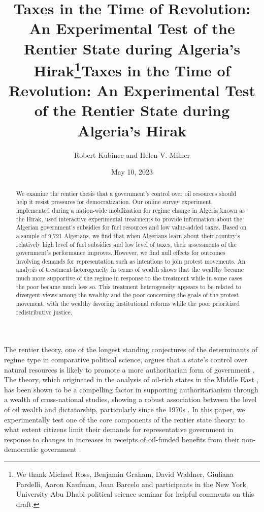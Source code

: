 \documentclass[12pt, letterpaper]{article}
\title{Taxes in the Time of Revolution: An Experimental Test of the Rentier State during Algeria's Hirak\thanks{We thank Michael Ross, Benjamin Graham, David Waldner, Giuliana Pardelli, Aaron Kaufman, Joan Barcelo and participants in the New York University Abu Dhabi political science seminar for helpful comments on this draft.}}
\author{Robert Kubinec and Helen V. Milner}
\title{Taxes in the Time of Revolution: An Experimental Test of the Rentier State during Algeria's Hirak}
\date{May 10, 2023}
\begin{document}
\maketitle

\begin{abstract}

We examine the rentier thesis that a government's control over oil resources should help it resist pressures for democratization. Our online survey experiment,  implemented during a nation-wide mobilization for regime change in Algeria known as the Hirak, used interactive experimental treatments to provide information about the Algerian government's subsidies for fuel resources and low value-added taxes. Based on a sample of 9,721 Algerians, we find that when Algerians learn about their country's relatively high level of fuel subsidies and low level of taxes, their assessments of the government's performance improves. However, we find null effects for outcomes involving demands for representation such as intentions to join protest movements. An analysis of treatment heterogeneity in terms of wealth shows that the wealthy became much more supportive of the regime in response to the treatment while in some cases the poor became much less so. This treatment heterogeneity appears to be related to divergent views among the wealthy and the poor concerning the goals of the protest movement, with the wealthy favoring institutional reforms while the poor prioritized redistributive justice.
    
\end{abstract}

\newpage

\doublespacing

The rentier theory, one of the longest standing conjectures of the determinants of regime type in comparative political science, argues that a state's control over natural resources is likely to promote a more authoritarian form of government \parencite{ross_does_2001,herb_no_2005,beblawi_rentier_1987}. The theory, which originated in the analysis of oil-rich states in the Middle East \parencite{crystal_oil_1990,beblawi_rentier_1987,ayubi_over-stating_1995}, has been shown to be a compelling factor in supporting authoritarianism through a wealth of cross-national studies, showing a robust association between the level of oil wealth and dictatorship, particularly since the 1970s \parencite{ross_what_2015}. In this paper, we experimentally test one of the core components of the rentier state theory: to what extent citizens limit their demands for representative government in response to changes in increases in receipts of oil-funded benefits from their non-democratic government \parencite{paler_keeping_2013,de_la_cuesta_oil_2019}.
\end{document}

